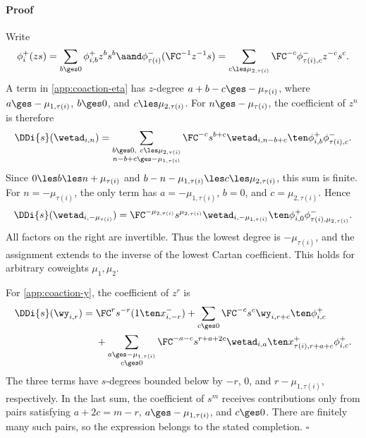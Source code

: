 \documentclass[reqno]{amsart}
\numberwithin{equation}{section}
\newenvironment{pf}{\medskip\paragraph{{\sc Proof}}}{\hfill$\square$\par\medskip}
\begin{document}
\begin{pf}
	Write
	\[
	\phi_i^+(zs)=\sum_{b\ges0}\phi_{i,b}^+z^bs^b
	\aand
	\phi_{\tau(i)}^-({\FC^{-1}z^{-1}} s)=\sum_{c\les\mu_{2,\tau(i)}}
	\FC^{-c}\phi_{\tau(i),c}^-z^{-c}s^c.
	\]
	A term in \eqref{app:coaction-eta} has $z$-degree $a+b-c\ges-\mu_{\tau(i)}$, where 
	$a\ges-\mu_{1,\tau(i)}$, $b\ges0$, and $c\les\mu_{2,\tau(i)}$. For 
	$n\ges-\mu_{\tau(i)}$, the coefficient of $z^n$ is therefore
	\begin{equation}
		\DDi{s}(\wetad_{i,n})
		=\sum_{\substack{b\ges0,\ c\les\mu_{2,\tau(i)}\\
				n-b+c\ges-\mu_{1,\tau(i)}}}
		\FC^{-c}s^{b+c}\wetad_{i,n-b+c}\ten
		\phi_{i,b}^+\phi_{\tau(i),c}^-.
		\label{app:eta-mode}
	\end{equation}
	Since $0\les b\les n+\mu_{\tau(i)}$ and $b-n-\mu_{1,\tau(i)}\les c\les\mu_{2,\tau(i)}$, 
	this sum is finite. For $n=-\mu_{\tau(i)}$, the only term has $a=-\mu_{1,\tau(i)}$, $b=0$, 
	and $c=\mu_{2,\tau(i)}$. Hence
	\begin{equation}
		\DDi{s}(\wetad_{i,-\mu_{\tau(i)}})
		=\FC^{-\mu_{2,\tau(i)}}s^{\mu_{2,\tau(i)}}
		\wetad_{i,-\mu_{1,\tau(i)}}\ten
		\phi_{i,0}^+\phi_{\tau(i),\mu_{2,\tau(i)}}^-.
		\label{app:lowest-eta-mode}
	\end{equation}
	All factors on the right are invertible. Thus the lowest degree is $-\mu_{\tau(i)}$, and the assignment extends to the inverse of the lowest Cartan coefficient. This holds for arbitrary coweights $\mu_1,\mu_2$.
	
	For \eqref{app:coaction-y}, the coefficient of $z^r$ is
	\begin{align}
		\DDi{s}(\wy_{i,r})={}&
		\FC^rs^{-r}(1\ten x_{i,-r}^-)
		+\sum_{c\ges0}\FC^{-c}s^c\wy_{i,r+c}\ten\phi_{i,c}^+\notag\\
		&+\sum_{\substack{a\ges-\mu_{1,\tau(i)}\\c\ges0}}
		\FC^{-a-c}s^{r+a+2c}\wetad_{i,a}\ten
		x_{\tau(i),r+a+c}^+\phi_{i,c}^+.
		\label{app:y-mode}
	\end{align}
	The three terms have $s$-degrees bounded below by $-r$, $0$, and 
	$r-\mu_{1,\tau(i)}$, respectively. In the last sum, the coefficient of $s^m$ receives 
	contributions only from pairs satisfying $a+2c=m-r$, $a\ges-\mu_{1,\tau(i)}$, and 
	$c\ges0$. There are finitely many such pairs, so the expression belongs to the stated 
	completion.
\end{pf}
\end{document}
